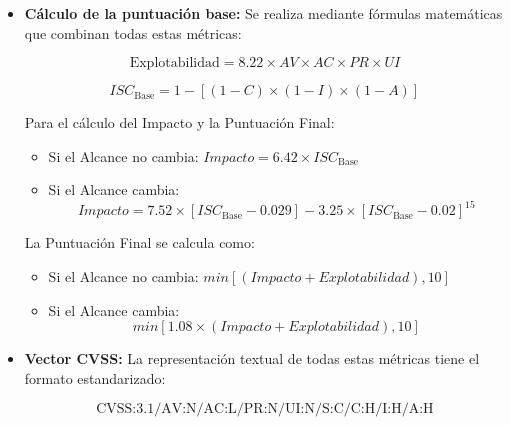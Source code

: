{\begin{itemize}
\begin{itemize}
        \item \textit{Métricas de Impacto:} Cuantifican el daño potencial.
        \begin{itemize}
            \item Alcance (S): ¿La vulnerabilidad afecta a otros componentes? Sin Cambio (U), Cambiado (C).
            \item Confidencialidad (C): Impacto en la protección de datos. Alto (0.56), Bajo (0.22), Ninguno (0).
            \item Integridad (I): Impacto en la fiabilidad de los datos. Alto (0.56), Bajo (0.22), Ninguno (0).
            \item Disponibilidad (A): Impacto en la accesibilidad. Alto (0.56), Bajo (0.22), Ninguno (0).
        \end{itemize}
    \end{itemize}
    
    \item \textbf{Cálculo de la puntuación base:} Se realiza mediante fórmulas matemáticas que combinan todas estas métricas:
    
    $$\text{Explotabilidad} = 8.22 \times AV \times AC \times PR \times UI$$
    
    $$ISC_{\text{Base}} = 1 - [(1 - C) \times (1 - I) \times (1 - A)]$$
    
    Para el cálculo del Impacto y la Puntuación Final:
    \begin{itemize}
        \item Si el Alcance no cambia: $Impacto = 6.42 \times ISC_{\text{Base}}$
        \item Si el Alcance cambia:
        $$Impacto = 7.52 \times [ISC_{\text{Base}} - 0.029] - 3.25 \times [ISC_{\text{Base}} - 0.02]^{15}$$
    \end{itemize}
    
    La Puntuación Final se calcula como:
    \begin{itemize}
        \item Si el Alcance no cambia: $min[(Impacto + Explotabilidad), 10]$
        \item Si el Alcance cambia: 
        $$min[1.08 \times (Impacto + Explotabilidad), 10]$$
    \end{itemize}
    
    \item \textbf{Vector CVSS:} La representación textual de todas estas métricas tiene el formato estandarizado:
    
    $$\text{CVSS:3.1/AV:N/AC:L/PR:N/UI:N/S:C/C:H/I:H/A:H}$$
    

\end{itemize}}
